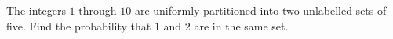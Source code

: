 The integers $1$ through $10$ are uniformly partitioned into two unlabelled sets of five. Find the probability that $1$ and $2$ are in the same set.
